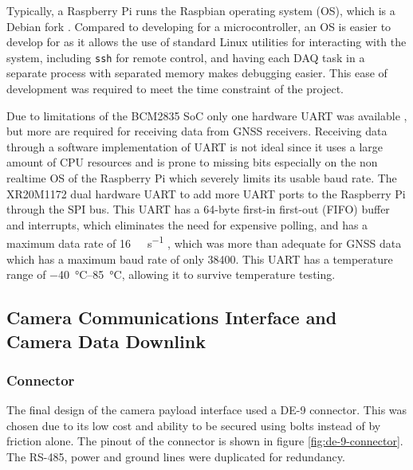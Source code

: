\documentclass{report}
\begin{document}
Typically, a Raspberry Pi runs the Raspbian operating system (OS), which is a Debian fork \cite{upton2016raspberry}. Compared to developing for a microcontroller, an OS is easier to develop for as it allows the use of standard Linux utilities for interacting with the system, including \texttt{ssh} for remote control, and having each DAQ task in a separate process with separated memory makes debugging easier. This ease of development was required to meet the time constraint of the project. %

Due to limitations of the BCM2835 SoC only one hardware UART was available \cite{upton2016raspberry}, but more are required for receiving data from GNSS receivers. Receiving data through a software implementation of UART is not ideal since it uses a large amount of CPU resources and is prone to missing bits especially on the non realtime OS of the Raspberry Pi which severely limits its usable baud rate. The XR20M1172 dual hardware UART to add more UART ports to the Raspberry Pi through the SPI bus. This UART has a 64-byte first-in first-out (FIFO) buffer and interrupts, which eliminates the need for expensive polling, and has a maximum data rate of \SI{16}{\mega\bit\per\second} \cite{maxlinear2022xr20m1172}, which was more than adequate for GNSS data which has a maximum baud rate of only \SI{38400}{\baud}. This UART has a temperature range of \SIrange{-40}{85}{\degreeCelsius}, allowing it to survive temperature testing.

\subsection{Camera Communications Interface and Camera Data Downlink}

\subsubsection{Connector}
The final design of the camera payload interface used a DE-9 connector. This was chosen due to its low cost and ability to be secured using bolts instead of by friction alone. The pinout of the connector is shown in figure \ref{fig:de-9-connector}. The RS-485, power and ground lines were duplicated for redundancy.
\end{document}
